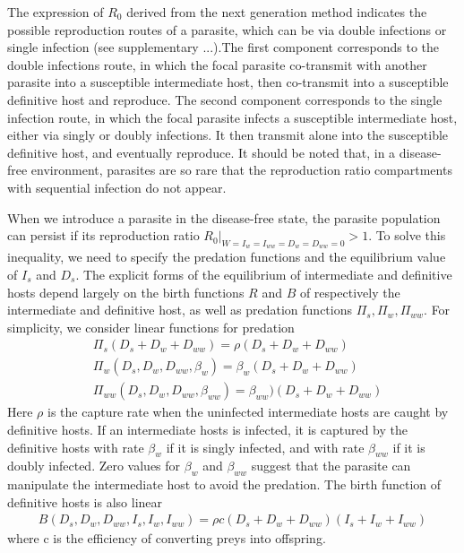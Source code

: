 \documentclass{article}
\begin{document}
The expression of $R_0$ derived from the next generation method indicates the possible reproduction routes of a parasite, which can be via double infections or single infection (see supplementary ...).The first component corresponds to the double infections route, in which the focal parasite co-transmit with another parasite into a susceptible intermediate host, then co-transmit into a susceptible definitive host and reproduce. The second component corresponds to the single infection route, in which the focal parasite infects a susceptible intermediate host, either via singly or doubly infections. It then transmit alone into the susceptible definitive host, and eventually reproduce. It should be noted that, in a disease-free environment, parasites are so rare that the reproduction ratio compartments with sequential infection do not appear. 


When we introduce a parasite in the disease-free state, the parasite population can persist if its reproduction ratio $R_0|_{W = I_{w} = I_{ww} = D_{w} = D_{ww} = 0} > 1$. To solve this inequality, we need to specify the predation functions and the equilibrium value of $I_s$ and $D_s$. The explicit forms of the equilibrium of intermediate and definitive hosts depend largely on the birth functions $R$ and $B$ of respectively the intermediate and definitive host, as well as predation functions $\Pi_s, \Pi_w, \Pi_{ww}$. For simplicity, we consider linear functions for predation 
\begin{align*}
& \Pi_s(D_s + D_w + D_{ww}) = \rho (D_s + D_w + D_{ww}) \\
& \Pi_w(D_s, D_w, D_{ww}, \beta_w) = \beta_w (D_s + D_w + D_{ww}) \\
& \Pi_{ww}(D_s, D_w, D_{ww}, \beta_{ww}) =  \beta_{ww}) (D_s + D_w + D_{ww})
\end{align*}
Here $\rho$ is the capture rate when the uninfected intermediate hosts are caught by definitive hosts. If an intermediate hosts is infected, it is captured by the definitive hosts with rate $\beta_w$ if it is singly infected, and with rate $\beta_{ww}$ if it is doubly infected. Zero values for $\beta_w$ and $\beta_{ww}$ suggest that the parasite can manipulate the intermediate host to avoid the predation. The birth function of definitive hosts is also linear
\begin{align*}
B(D_s, D_w, D_{ww}, I_s, I_w, I_{ww}) = \rho c (D_s + D_w + D_{ww}) (I_s + I_w + I_{ww})
\end{align*}
where c is the efficiency of converting preys into offspring.
\end{document}
